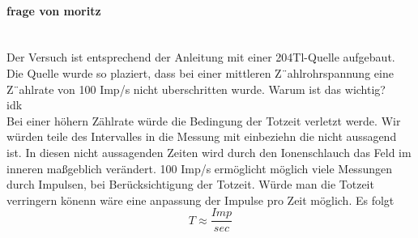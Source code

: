 \paragraph{frage von moritz} %
\mbox{}
\\ 
Der Versuch ist entsprechend der Anleitung mit einer 204Tl-Quelle aufgebaut. Die Quelle wurde so plaziert, dass bei einer mittleren Z¨ahlrohrspannung eine Z¨ahlrate von 100 Imp/s nicht
uberschritten wurde. Warum ist das wichtig?\\
idk\\
Bei einer höhern Zählrate würde die Bedingung der Totzeit verletzt werde. Wir würden teile des Intervalles in die Messung mit einbeziehn die nicht aussagend ist. In diesen nicht aussagenden Zeiten 
wird durch den Ionenschlauch das Feld im inneren maßgeblich verändert.
100 Imp/s ermöglicht möglich viele Messungen durch Impulsen, bei Berücksichtigung der Totzeit. Würde man die Totzeit verringern könenn wäre eine anpassung der Impulse pro Zeit möglich. Es folgt
\begin{equation*}
T \approx \frac{Imp}{sec}
\end{equation*}